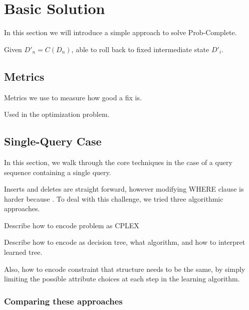 

\section{Basic Solution}

In this section we will introduce a simple approach to solve Prob-Complete.


Given $D'_n = C(D_n)$, able to roll back to fixed intermediate state $D'_i$.


\subsection{Metrics}

Metrics we use to measure how good a fix is.

Used in the optimization problem.




\subsection{Single-Query Case}

In this section, we walk through the core techniques in the case of a query sequence containing a single query.

Inserts and deletes are straight forward, however modifying WHERE clause is harder because
.  To deal with this challenge, we tried three algorithmic approaches.

Describe how to encode problem as CPLEX



Describe how to encode as decision tree, what algorithm, and how to interpret learned tree.

Also, how to encode constraint that structure needs to be the same, by simply limiting the possible attribute
choices at each step in the learning algorithm.

\subsubsection{Comparing these approaches}

